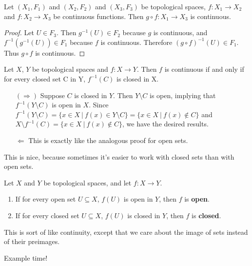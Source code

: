 \begin{smallfact}
 Let $(X_1,F_1)$ and $(X_2,F_2)$ and $(X_3,F_3)$ be topological spaces, $f: X_1 \to X_2$ and $f: X_2 \to X_3$ be continuous functions. Then $g \circ f: X_1 \to X_3$ is continuous.
 \end{smallfact}
\begin{proof}
Let $U \in F_3$.  Then $g^{-1}(U) \in F_2$ because $g$ is continuous, and $f^{-1}(g^{-1}(U)) \in F_1$ because $f$ is continuous. Therefore $(g \circ f)^{-1}(U) \in F_1$. Thus $g\circ f$ is continuous.
\end{proof}

\begin{theorem}
Let $X$, $Y$ be topological spaces and $f: X \to Y$. Then $f$ is continuous if and only if for every closed set C in Y, $f^{-1}(C)$ is closed in X.
\end{theorem}

\begin{itemize}
\item [$(\Rightarrow)$] Suppose $C$ is closed in $Y$. Then $Y\setminus C$ is open, implying that $f^{-1}(Y\setminus C)$ is open in $X$. Since $f^{-1}(Y\setminus C)= \{ x \in X\ |\ f(x) \in Y\setminus C\} = \{ x \in X\ |\ f(x) \notin C \}$ and $X\setminus f^{-1}(C)= \{ x \in X\ |\ f(x) \notin C \}$, we have the desired results.
\item [$\Leftarrow$] This is exactly like the analogous proof for open sets.
\end{itemize}

This is nice, because sometimes it's easier to work with closed sets than with open sets.

\begin{definition}
Let $X$ and $Y$ be topological spaces, and let $f:X\to Y$.  
\begin{enumerate}
\item If for every open set $U\subseteq X$, $f(U)$ is open in $Y$, then $f$ is {\bf open}.
\item If for every closed set $U\subseteq X$, $f(U)$ is closed in $Y$, then $f$ is {\bf closed}.
\end{enumerate}
\end{definition}


This is sort of like continuity, except that we care about the image of sets instead of their preimages.

Example time!

